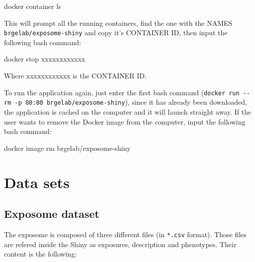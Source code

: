 \documentclass[
]{book}
\newenvironment{Shaded}{\begin{snugshade}}{\end{snugshade}}
\newcommand{\ExtensionTok}[1]{#1}
\newcommand{\NormalTok}[1]{#1}
\begin{document}
\begin{Shaded}
\begin{Highlighting}[]
\ExtensionTok{docker}\NormalTok{ container ls}
\end{Highlighting}
\end{Shaded}

This will prompt all the running containers, find the one with the NAMES \texttt{brgelab/exposome-shiny} and copy it's CONTAINER ID, then input the following bash command:

\begin{Shaded}
\begin{Highlighting}[]
\ExtensionTok{docker}\NormalTok{ stop xxxxxxxxxxxx}
\end{Highlighting}
\end{Shaded}

Where xxxxxxxxxxxx is the CONTAINER ID.

To run the application again, just enter the first bash command (\texttt{docker\ run\ -\/-rm\ -p\ 80:80\ brgelab/exposome-shiny}), since it has already been downloaded, the application is cached on the computer and it will launch straight away. If the user wants to remove the Docker image from the computer, input the following bash command:

\begin{Shaded}
\begin{Highlighting}[]
\ExtensionTok{docker}\NormalTok{ image rm brgelab/exposome-shiny}
\end{Highlighting}
\end{Shaded}

\hypertarget{data-sets}{%
\chapter{Data sets}\label{data-sets}}

\hypertarget{exposome-dataset}{%
\section{Exposome dataset}\label{exposome-dataset}}

The exposome is composed of three different files (in \texttt{*.csv} format). Those files are refered inside the Shiny as exposures, description and phenotypes. Their content is the following:
\end{document}
